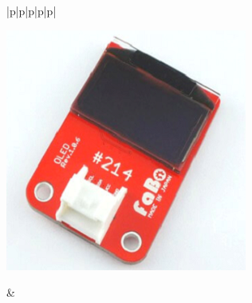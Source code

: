 \begin{table}[H]
\begin{tabular}{|p{\colA}|p{\colB}|p{\colC}|p{\colD}|p{\colE}|}
    \begin{minipage}[t]{\linewidth}
    \smallskip
      \centering
      \includegraphics[width=0.8\linewidth]{images/chap05/text05-img025.png}
      \smallskip
    \end{minipage} &
    \pageref{oled}\\ \hline
    \end{tabular}
\end{table}